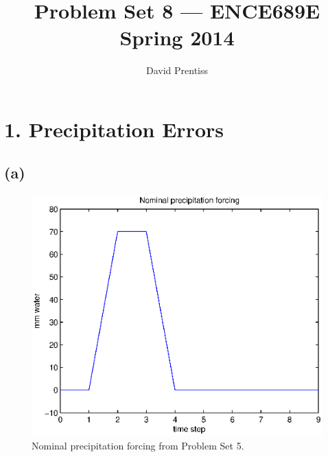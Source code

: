 \documentclass[letterpaper]{tufte-handout}
\title{Problem Set 8 --- ENCE689E Spring 2014}
\author{David Prentiss}
\begin{document}
\maketitle

\section{1. Precipitation Errors}
\subsection{(a)}
\begin{figure}
  \includegraphics[width=\textwidth]{1a}
  \caption{Nominal precipitation forcing from Problem Set 5.}
  \label{1b}
\end{figure}
\end{document}
